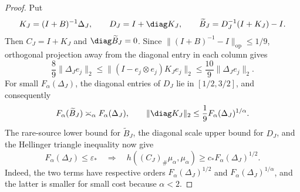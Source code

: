 \begin{proof}
Put
\[
 K_J=(I+B)^{-1}\Delta_J,
 \qquad
 D_J=I+\diag K_J,
 \qquad
 \widetilde B_J=D_J^{-1}(I+K_J)-I.
\]
Then \(C_J=I+K_J\) and \(\diag\widetilde B_J=0\).
Since \(\|(I+B)^{-1}-I\|_{\mathrm{op}}\le1/9\), orthogonal projection
away from the diagonal entry in each column gives
\[
 \frac89\|\Delta_Je_j\|_2
 \le\|(I-e_j\otimes e_j)K_Je_j\|_2
 \le\frac{10}{9}\|\Delta_Je_j\|_2.
\]
For small \(F_\alpha(\Delta_J)\), the diagonal entries of \(D_J\) lie in
\([1/2,3/2]\), and consequently
\begin{equation}
 F_\alpha(\widetilde B_J)\asymp_\alpha F_\alpha(\Delta_J),
 \qquad
 \|\diag K_J\|_2
 \le\frac19F_\alpha(\Delta_J)^{1/\alpha}.
 \label{eq:stable-sign-cut-comparison}
\end{equation}
The rare-source lower bound for \(\widetilde B_J\), the diagonal scale upper
bound for \(D_J\), and the Hellinger triangle inequality now give
\begin{equation}
 F_\alpha(\Delta_J)\le\varepsilon_*
 \quad\Longrightarrow\quad
 h((C_J)_\#\mu_\alpha,\mu_\alpha)
 \ge c_*F_\alpha(\Delta_J)^{1/2}.
 \label{eq:stable-sign-cut-lower-bound}
\end{equation}
Indeed, the two terms have respective orders
\(F_\alpha(\Delta_J)^{1/2}\) and
\(F_\alpha(\Delta_J)^{1/\alpha}\), and the latter is smaller for small
cost because \(\alpha<2\).


\end{proof}
